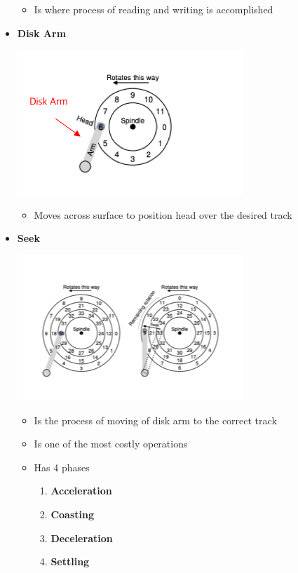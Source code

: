 \documentclass[12pt]{article}
\begin{document}
\begin{itemize}
    \begin{itemize}
        \item Is where process of reading and writing is accomplished
    \end{itemize}

    \item \textbf{Disk Arm}

    \begin{center}
        \includegraphics[width=0.6\linewidth]{../images/midterm_4_solution_52.png}
    \end{center}

    \begin{itemize}
        \item Moves across surface to position head over the desired track
    \end{itemize}

    \item \textbf{Seek}

    \begin{center}
        \includegraphics[width=0.6\linewidth]{../images/midterm_4_solution_55.png}
    \end{center}

    \begin{itemize}
        \item Is the process of moving of disk arm to the correct track
        \item Is one of the most costly operations
        \item Has 4 phases
        \begin{enumerate}[1.]
            \item \textbf{Acceleration}
            \item \textbf{Coasting}
            \item \textbf{Deceleration}
            \item \textbf{Settling}
        \end{enumerate}
    \end{itemize}


\end{itemize}
\end{document}
